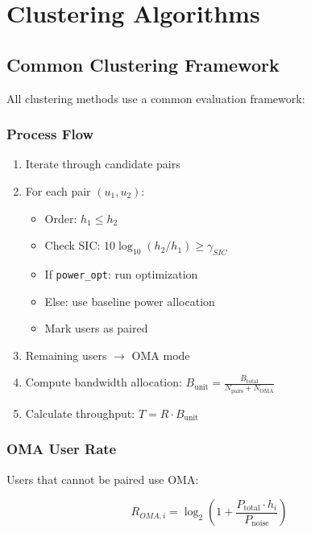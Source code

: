 \documentclass[12pt,a4paper]{article}
\newcommand{\code}[1]{\texttt{#1}}
\begin{document}
\section{Clustering Algorithms}

\subsection{Common Clustering Framework}

All clustering methods use a common evaluation framework:

\subsubsection{Process Flow}

\begin{enumerate}
    \item Iterate through candidate pairs
    \item For each pair $(u_1, u_2)$:
    \begin{itemize}
        \item Order: $h_1 \leq h_2$
        \item Check SIC: $10\log_{10}(h_2/h_1) \geq \gamma_{SIC}$
        \item If \code{power\_opt}: run optimization
        \item Else: use baseline power allocation
        \item Mark users as paired
    \end{itemize}
    \item Remaining users $\rightarrow$ OMA mode
    \item Compute bandwidth allocation: $B_{\text{unit}} = \frac{B_{\text{total}}}{N_{\text{pairs}} + N_{\text{OMA}}}$
    \item Calculate throughput: $T = R \cdot B_{\text{unit}}$
\end{enumerate}

\subsubsection{OMA User Rate}

Users that cannot be paired use OMA:

\begin{equation}
R_{OMA,i} = \log_2\left(1 + \frac{P_{\text{total}} \cdot h_i}{P_{\text{noise}}}\right)
\end{equation}
\end{document}
